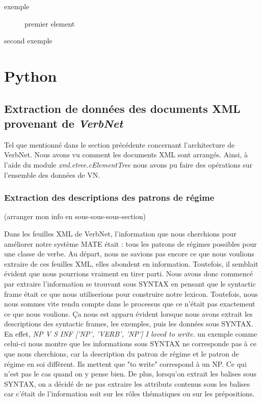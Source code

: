\begin{description}
\item [exemple] premier element
\item [second exemple]
\end{description}

\section{Python}

\subsection{Extraction de données des documents XML provenant de \emph{VerbNet} }

Tel que mentionné dans le section précédente concernant l'architecture de VerbNet. Nous avons vu comment les documents XML sont  arrangés. Ainsi, à l'aide du module \emph{xml.etree.cElementTree} nous avons pu faire des opérations sur l'ensemble des données de VN.

\subsubsection{Extraction des descriptions des  patrons de régime}

(arranger mon info en sous-sous-sous-section)

Dans les feuilles XML de VerbNet, l'information que nous cherchions pour améliorer notre système MATE était : tous les patrons de régimes possibles pour une classe de verbe. Au départ, nous ne savions pas encore ce que nous voulions extraire de ces feuilles XML, elles abondent en information. Toutefois, il semblait évident que nous pourrions vraiment en tirer parti. Nous avons donc commencé par extraire l'information se trouvant sous SYNTAX en pensant que le syntactic frame était ce que nous utiliserions pour construire notre lexicon. Toutefois, nous nous sommes vite rendu compte dans le processus que ce n'était pas exactement ce que  nous voulions. Ça nous est apparu évident lorsque nous avons extrait les descriptions des syntactic frames, les exemples, puis les données sous SYNTAX. En effet, \emph{ NP V S INF ['NP', 'VERB', 'NP'] I loved to write.} un exemple comme celui-ci nous montre que les informations sous SYNTAX ne corresponde pas à ce que nous cherchions, car la description du patron de régime et le patron de régime en soi diffèrent. Ils mettent que "to write" correspond à un NP. Ce qui n'est pas le cas quand on y pense bien. De plus, lorsqu'on extrait les balises sous SYNTAX, on a décidé de ne pas extraire les attributs contenus sous les balises car c'était de l'information soit sur les rôles thématiques ou sur les prépositions. 

